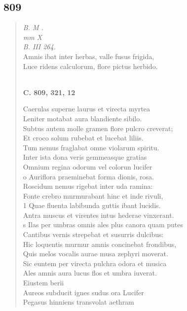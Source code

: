 \documentclass[11pt, a4paper]{report}
\begin{document}
            \subsection*{809}
      \begin{verse}
      \textit{B. M .} \\ \textit{mm X} \\ \textit{B. III 264.} \\ Amnis ibat inter herbas, valle fusus frigida, \\ Luce ridens calculorum, flore pictus herbido. \\ 
        ﻿\pagebreak 
    \begin{center} \textbf{C. 809, 321, 12} \end{center} \marginpar{[297]} Caerulas superne laurus et virecta myrtea \\ Leniter motabat aura blandiente sibilo. \\ Subtus autem molle gramen flore pulcro creverat; \\ Et croco solum rubebat et lucebat liliis. \\ Tum nemus fraglabat omne violarum spiritu. \\ Inter ista dona veris gemmeasque gratias \\ Omnium regina odorum vel colorun lucifer \\ o Auriflora praeminebat forma dionis, rosa. \\ Roscidum nemus rigebat inter uda ramina: \\ Fonte crebro mnrmurabant hinc et inde rivuli, \\ 1 Quae fluenta labibunda guttis ibant lucidis. \\ Antra muscus et virentes intus  \lbrack hederae \rbrack  vinxerant. \\ s Ilas per umbras omnis ales plus canora quam putes \\ Cantibus vernis strepebat et susurris dulcibus: \\ Hic loquentis murmur amnis concinebat frondibus, \\ Quis melos vocalis aurae musa zephyri moverat. \\ Sic euntem per virecta pulchra odora et musica \\ Ales amnis aura lucus flos et umbra iuverat. \\ Eiustem berii \\ Aureos subducit ignes sudus ora Lucifer \\ Pegasus hinniens transvolat aethram \\ 

\end{verse}
\end{document}
